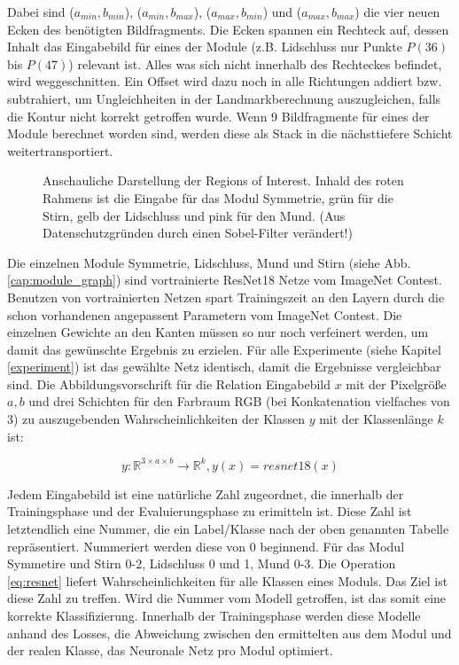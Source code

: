 Dabei sind ($a_{min}, b_{min}$), ($a_{min}, b_{max}$), ($a_{max}, b_{min}$) und ($a_{max}, b_{max}$) die vier neuen Ecken des benötigten Bildfragments. Die Ecken spannen ein Rechteck auf, dessen Inhalt das Eingabebild für eines der Module (z.B. Lidschluss nur Punkte $P(36)$ bis $P(47)$) relevant ist. Alles was sich nicht innerhalb des Rechteckes befindet, wird weggeschnitten. Ein Offset wird dazu noch in alle Richtungen addiert bzw. subtrahiert, um Ungleichheiten in der Landmarkberechnung auszugleichen, falls die Kontur nicht korrekt getroffen wurde. Wenn 9 Bildfragmente für eines der Module berechnet worden sind, werden diese als Stack in die nächsttiefere Schicht weitertransportiert.

\begin{figure}[!t]\centering
\vspace{-1cm}
\makebox[0pt]{}
\vspace{-1cm}
\caption[Anschauliche Darstellung der Regions of Interest]{Anschauliche Darstellung der Regions of Interest\footnotemark. Inhald des roten Rahmens ist die Eingabe für das Modul Symmetrie, grün für die Stirn, gelb der Lidschluss und pink für den Mund. (Aus Datenschutzgründen durch einen Sobel-Filter verändert!)}\label{cap:r_of_interest}
\end{figure}\label{fig:r_of_interest}


Die einzelnen Module Symmetrie, Lidschluss, Mund und Stirn (siehe Abb. \ref{cap:module_graph}) sind vortrainierte ResNet18 Netze vom ImageNet Contest. Benutzen von vortrainierten Netzen spart Trainingszeit an den Layern durch die schon vorhandenen angepassent Parametern vom ImageNet Contest. Die einzelnen Gewichte an den Kanten müssen so nur noch verfeinert werden, um damit das gewünschte Ergebnis zu erzielen. Für alle Experimente (siehe Kapitel \ref{experiment}) ist das gewählte Netz identisch, damit die Ergebnisse vergleichbar sind. Die Abbildungsvorschrift für die Relation Eingabebild $x$ mit der Pixelgröße $a, b$ und drei Schichten für den Farbraum RGB (bei Konkatenation vielfaches von 3) zu auszugebenden Wahrscheinlichkeiten der Klassen $y$ mit der Klassenlänge $k$ ist:

\begin{equation}
y: \mathbb{R}^{3 \times a \times b} \to \mathbb{R}^{k}, y(x) = resnet18(x)
\label{eq:resnet}
\end{equation}

Jedem Eingabebild ist eine natürliche Zahl zugeordnet, die innerhalb der Trainingsphase und der Evaluierungsphase zu erimitteln ist. Diese Zahl ist letztendlich eine Nummer, die ein Label/Klasse nach der oben genannten Tabelle repräsentiert. Nummeriert werden diese von 0 beginnend. Für das Modul Symmetire und Stirn 0-2, Lidschluss 0 und 1, Mund 0-3. Die Operation \ref{eq:resnet} liefert Wahrscheinlichkeiten für alle Klassen eines Moduls. Das Ziel ist diese Zahl zu treffen. Wird die Nummer vom Modell getroffen, ist das somit eine korrekte Klassifizierung. Innerhalb der Trainingsphase werden diese Modelle anhand des Losses, die Abweichung zwischen den ermittelten aus dem Modul und der realen Klasse, das Neuronale Netz pro Modul optimiert.

